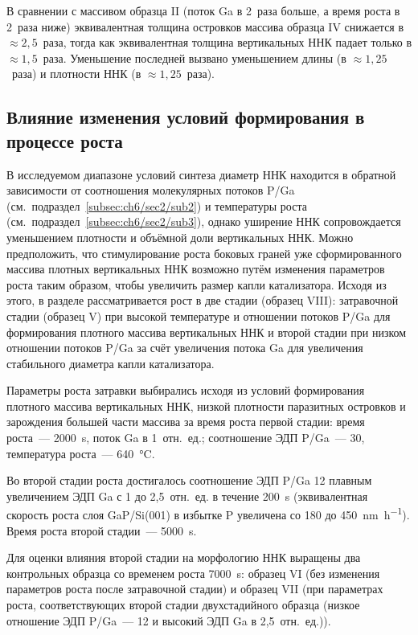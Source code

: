 В сравнении с массивом образца II (поток Ga в 2~раза больше, а время роста в
2~раза ниже) эквивалентная толщина островков массива образца IV снижается в
\(\approx 2,5\)~раза, тогда как эквивалентная толщина вертикальных ННК падает
только в \(\approx 1,5\)~раза. Уменьшение последней вызвано уменьшением длины
(в \(\approx 1,25\)~раза) и плотности ННК (в \(\approx 1,25\)~раза).

\subsection{Влияние изменения условий формирования в процессе
роста}\label{subsec:ch6/sec2/sub5}

В исследуемом диапазоне условий синтеза диаметр ННК находится в обратной
зависимости от соотношения молекулярных потоков P/Ga
(см.~подраздел~\cref{subsec:ch6/sec2/sub2}) и температуры роста
(см.~подраздел~\cref{subsec:ch6/sec2/sub3}), однако уширение ННК сопровождается
уменьшением плотности и объёмной доли вертикальных ННК. Можно предположить, что
стимулирование роста боковых граней уже сформированного массива плотных
вертикальных ННК возможно путём изменения параметров роста таким образом, чтобы
увеличить размер капли катализатора. Исходя из этого, в разделе рассматривается
рост в две стадии (образец VIII): затравочной стадии (образец V) при высокой
температуре и отношении потоков P/Ga для формирования плотного массива
вертикальных ННК и второй стадии при низком отношении потоков P/Ga за счёт
увеличения потока Ga для увеличения стабильного диаметра капли катализатора.

Параметры роста затравки выбирались исходя из условий формирования плотного
массива вертикальных ННК, низкой плотности паразитных островков и зарождения
большей части массива за время роста первой стадии: время роста~---
2000~\si{\second}, поток Ga в 1~отн.~ед.; соотношение ЭДП P/Ga~--- 30,
температура роста~--- 640~\si{\degreeCelsius}.

Во второй стадии роста  достигалось соотношение ЭДП P/Ga 12 плавным увеличением
ЭДП Ga с 1 до 2,5~отн.~ед. в течение 200~\si{\second} (эквивалентная скорость
роста слоя GaP/Si(001) в избытке P увеличена со 180 до
450~\si{\nano\meter\per\hour}). Время роста второй стадии~---
5000~\si{\second}.

Для оценки влияния второй стадии на морфологию ННК выращены два контрольных
образца со временем роста 7000~\si{\second}: образец VI (без изменения
параметров роста после затравочной стадии) и образец VII (при параметрах роста,
соответствующих второй стадии двухстадийного образца (низкое отношение ЭДП
P/Ga~--- 12 и высокий ЭДП Ga в 2,5~отн.~ед.)).

